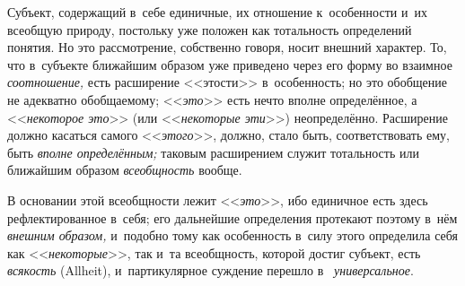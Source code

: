 Субъект, содержащий в~себе единичные, их отношение к~особенности и~их всеобщую
природу, постольку уже положен как тотальность определений понятия. Но это
рассмотрение, собственно говоря, носит внешний характер. То, что в~субъекте
ближайшим образом уже приведено через его форму во взаимное {\em соотношение,}
есть расширение <<этости>> в~особенность; но это обобщение не адекватно
обобщаемому; <<{\em это}>> есть нечто вполне определённое, а <<{\em некоторое
это}>> (или <<{\em некоторые эти}>>) неопределённо. Расширение должно касаться
самого <<{\em этого}>>, должно, стало быть, соответствовать ему, быть
{\em вполне определённым;} таковым расширением служит тотальность или
ближайшим образом {\em всеобщность} вообще.

В основании этой всеобщности лежит <<{\em это}>>, ибо единичное есть здесь
рефлектированное в~себя; его дальнейшие определения протекают поэтому в~нём
{\em внешним образом,} и~подобно тому как особенность в~силу этого определила
себя как <<{\em некоторые}>>, так и~та всеобщность, которой достиг субъект,
есть {\em всякость} (Allheit), и~партикулярное суждение перешло в~{\em
универсальное}.


